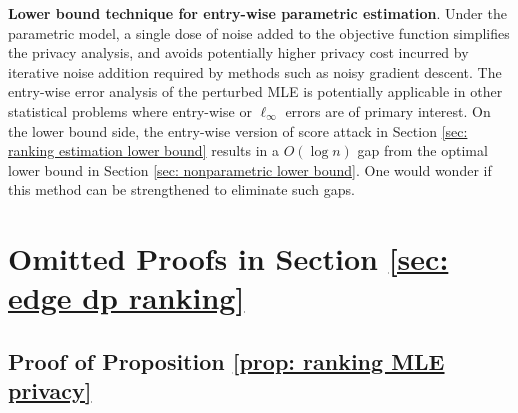 \documentclass[letterpaper,12pt]{article}
\numberwithin{equation}{section}
\theoremstyle{plain}
\numberwithin{Theorem}{section}
\numberwithin{corollary}{section}
\numberwithin{proposition}{section}
\numberwithin{Lemma}{section}
{
	\theoremstyle{definition}
	\newtheorem{Definition}{Definition}
	\newtheorem{example}{Example}
	\numberwithin{example}{section}
	\newtheorem{fact}{Fact}
	\numberwithin{fact}{section}
	\newtheorem{remark}{Remark}
}
\newcommand{\1}{\mathbbm{1}}
\begin{document}
{\bf Lower bound technique for entry-wise parametric estimation}. Under the parametric model, a single dose of noise added to the objective function simplifies the privacy analysis, and avoids potentially higher privacy cost incurred by iterative noise addition required by methods such as noisy gradient descent. The entry-wise error analysis of the perturbed MLE is potentially applicable in other statistical problems where entry-wise or $\ell_\infty$ errors are of primary interest. On the lower bound side, the entry-wise version of score attack in Section \ref{sec: ranking estimation lower bound} results in a $O(\log n)$ gap from the optimal lower bound in Section \ref{sec: nonparametric lower bound}. One would wonder if this method can be strengthened to eliminate such gaps.

 




\appendix

 
\section{Omitted Proofs in Section \ref{sec: edge dp ranking}}
\label{sec: omitted proofs in sec: edge dp ranking}

\subsection{Proof of Proposition \ref{prop: ranking MLE privacy}}
\label{sec: proof of prop: ranking MLE privacy}
 
\end{document}
